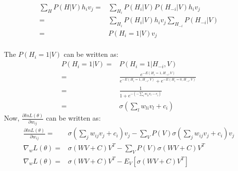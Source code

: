 \begin{spacing}{1.5}
\begin{equation}
    \begin{aligned}
    \sum_{H}P(H|V)h_{i}v_{j}=&\sum_{H_{i}}P(H_{i}|V)P(H_{-i}|V)h_{i}v_{j}\\                =&\sum_{H_{i}}P(H_{i}|V)h_{i}v_{j}\sum_{H_{-i}}P(H_{-i}|V)\\
                =&P(H_{i}=1|V)v_{j}\\
    \end{aligned}
\end{equation}

The $P(H_{i}=1|V)$ can be written as:
\begin{equation}
    \begin{aligned}
    P(H_{i}=1|V)=&P(H_{i}=1|H_{-i},V)\\
                =&\frac{e^{-E(H_{i}=1,H_{-i},V)}}{e^{-E(H_{i}=1,H_{-i},V)}+e^{-E(H_{i}=0,H_{-i},V)}}\\
                =&\frac{1}{1+e^{-(-\sum_{l}w_{li}v_{l}-c_{i})}}\\
                =&\sigma({\sum_{l}w_{li}v_{l}+c_{i}})
    \end{aligned}
\end{equation}
Now, $\frac{\partial ln L(\theta)}{\partial w_{ij}}$ can be written as:
\begin{equation}
    \begin{aligned}
    \frac{\partial ln L(\theta)}{\partial w_{ij}}=&\sigma({\sum_{j}w_{ij}v_{j}+c_{i}})v_{j}-\sum_{V}P(V)\sigma({\sum_{j}w_{ij}v_{j}+c_{i}})v_{j}\\
    \nabla_{w}L(\theta)=&\sigma(WV+C)V^{T}-\sum_{V}P(V)\sigma(WV+C)V^{T}\\
    \nabla_{w}L(\theta)=&\sigma(WV+C)V^{T}-E_{V}[\sigma(WV+C)V^{T}]
    \end{aligned}
\end{equation}


\end{spacing}
